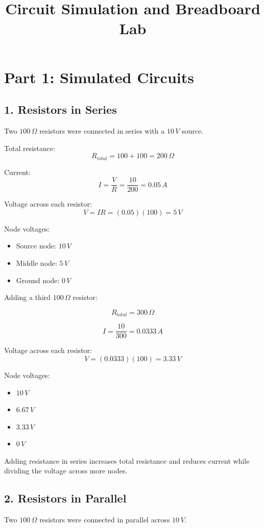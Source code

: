 \documentclass[11pt]{article}
\title{Circuit Simulation and Breadboard Lab}
\author{}
\date{}
\begin{document}
\maketitle

\section*{Part 1: Simulated Circuits}

\subsection*{1. Resistors in Series}

Two $100\,\Omega$ resistors were connected in series with a $10\,V$ source.

Total resistance:
\[
R_{total} = 100 + 100 = 200\,\Omega
\]

Current:
\[
I = \frac{V}{R} = \frac{10}{200} = 0.05\,A
\]

Voltage across each resistor:
\[
V = IR = (0.05)(100) = 5\,V
\]

Node voltages:
\begin{itemize}
\item Source node: $10\,V$
\item Middle node: $5\,V$
\item Ground node: $0\,V$
\end{itemize}

Adding a third $100\,\Omega$ resistor:

\[
R_{total} = 300\,\Omega
\]

\[
I = \frac{10}{300} = 0.0333\,A
\]

Voltage across each resistor:
\[
V = (0.0333)(100) = 3.33\,V
\]

Node voltages:
\begin{itemize}
\item $10\,V$
\item $6.67\,V$
\item $3.33\,V$
\item $0\,V$
\end{itemize}

Adding resistance in series increases total resistance and reduces current while dividing the voltage across more nodes.

\subsection*{2. Resistors in Parallel}

Two $100\,\Omega$ resistors were connected in parallel across $10\,V$.
\end{document}
